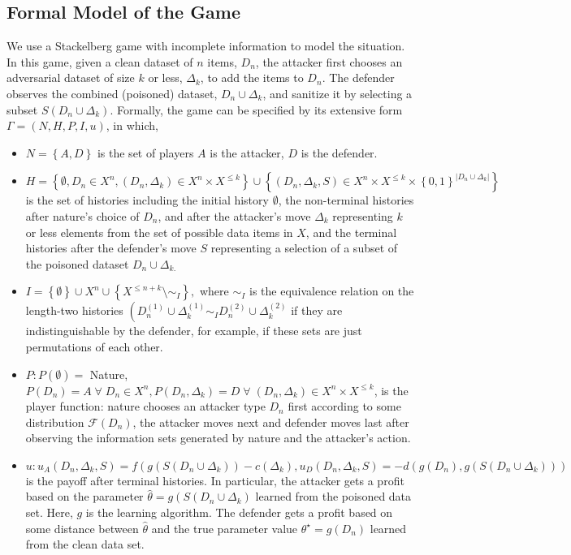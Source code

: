 \documentclass{article}
\begin{document}
\subsection{Formal Model of the Game}
We use a Stackelberg game with incomplete information to model the situation. In this game, given a clean dataset of $n $ items, $D_{n}$, the attacker first chooses an adversarial dataset of size $k $ or less, $\Delta_{k}$, to add the items to $D_{n}$. The defender observes the combined (poisoned) dataset, $D_{n} \cup \Delta_{k}$, and sanitize it by selecting a subset $S\left(D_{n} \cup \Delta_{k}\right) $. Formally, the game can be specified by its extensive form $\Gamma = \left(N, H, P, I, u \right)$, in which,
\begin{itemize}
\item $N  = \left\{A , D \right\}$ is the set of players $A $ is the attacker, $D $ is the defender.
\item $H  = \left\{\emptyset, D_{n} \in X^{n}, \left(D_{n}, \Delta_{k}\right) \in X^{n} \times X^{\leq  k}\right\} \cup \left\{\left(D_{n}, \Delta_{k}, S\right) \in X^{n} \times X^{\leq  k} \times \left\{0, 1\right\}^{|D_{n} \cup \Delta_{k}|}\right\}$ is the set of histories including the initial history $\emptyset$, the non-terminal histories after nature's choice of $D_{n}$, and after the attacker's move $\Delta_{k}$ representing $k $ or less elements from the set of possible data items in $X $, and the terminal histories after the defender's move $S $ representing a selection of a subset of the poisoned dataset $D_{n} \cup \Delta_{k.}$
\item $I  = \left\{\emptyset\right\} \cup X^{n} \cup \left\{X^{\leq  n + k} \setminus  \sim _{I}\right\},$ where $\sim _{I}$ is the equivalence relation on the length-two histories $\left(D_{n}^{\left(1\right)} \cup \Delta_{k}^{\left(1\right)} \sim _{I} D_{n}^{\left(2\right)} \cup \Delta_{k}^{\left(2\right)}\right.$ if they are indistinguishable by the defender, for example, if these sets are just permutations of each other.
\item $P  : P\left(\emptyset\right) =$ Nature, $P\left(D_{n}\right)  = A  \;\forall\; D_{n} \in X^{n}, P\left(D_{n}, \Delta_{k}\right)  = D  \;\forall\; \left(D_{n}, \Delta_{k}\right) \in X^{n} \times X^{\leq  k}$, is the player function: nature chooses an attacker type $D_{n}$ first according to some distribution $\mathcal{F}\left(D_{n}\right)$, the attacker moves next and defender moves last after observing the information sets generated by nature and the attacker's action.
\item $u  : u_{A}\left(D_{n}, \Delta_{k}, S\right) = f\left(g\left(S\left(D_{n} \cup \Delta_{k}\right)\right) - c\left(\Delta_{k}\right), u_{D}\left(D_{n}, \Delta_{k}, S\right) = -d\left(g\left(D_{n}\right), g\left(S\left(D_{n} \cup \Delta_{k}\right)\right)\right)\right.$ is the payoff after terminal histories. In particular, the attacker gets a profit based on the parameter $\hat{\theta} = g\left(S\left(D_{n} \cup \Delta_{k}\right)\right.$ learned from the poisoned data set. Here, $g $ is the learning algorithm. The defender gets a profit based on some distance between $\hat{\theta}$ and the true parameter value $\theta^\star  = g\left(D_{n}\right)$ learned from the clean data set.

\end{itemize}
\end{document}
